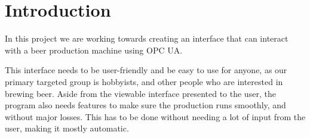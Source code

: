 \section{Introduction}

In this project we are working towards creating an interface that can interact with a beer production machine using OPC UA. \newline

This interface needs to be user-friendly and be easy to use for anyone, as our primary targeted group is hobbyists, and other people who are interested in brewing beer. \newline
Aside from the viewable interface presented to the user, the program also needs features to make sure the production runs smoothly, and without major losses. \newline
This has to be done without needing a lot of input from the user, making it mostly automatic. \newline
